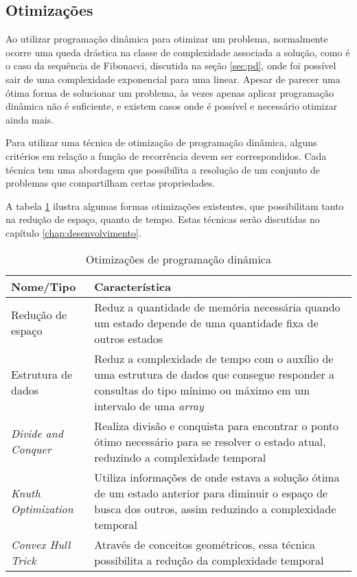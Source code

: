 \subsection{Otimizações}

Ao utilizar programação dinâmica para otimizar um problema, normalmente ocorre uma queda drástica na classe de complexidade associada a solução, como é o caso da sequência de Fibonacci, discutida na seção \ref{sec:pd}, onde foi possível sair de uma complexidade exponencial para uma linear. Apesar de parecer uma ótima forma de solucionar um problema, às vezes apenas aplicar programação dinâmica não é suficiente, e existem casos onde é possível e necessário otimizar ainda mais.

Para utilizar uma técnica de otimização de programação dinâmica, alguns critérios em relação a função de recorrência devem ser correspondidos. Cada técnica tem uma abordagem que possibilita a resolução de um conjunto de problemas que compartilham certas propriedades.

A tabela \ref{tab:otimizacoes} ilustra algumas formas otimizações existentes, que possibilitam tanto na redução de espaço, quanto de tempo. Estas técnicas serão discutidas no capítulo \ref{chap:desenvolvimento}.

\begin{table}[H]
	\centering
	\caption[Otimizações de programação dinâmica]{Otimizações de programação dinâmica}
	\label{tab:otimizacoes}
	\begin{tabular}{p{4cm} | p{11cm}}
		\hline \SPACE
		\textbf{Nome/Tipo} & \textbf{Característica} \\ \hline \SPACE
		Redução de espaço &  Reduz a quantidade de memória necessária quando um estado depende de uma quantidade fixa de outros estados \\ \hline \SPACE
		Estrutura de dados &  Reduz a complexidade de tempo com o auxílio de uma estrutura de dados que consegue responder a consultas do tipo mínimo ou máximo em um intervalo de uma \textit{array}  \\ \hline \SPACE
		\textit{Divide and Conquer} & Realiza divisão e conquista para encontrar o ponto ótimo necessário para se resolver o estado atual, reduzindo a complexidade temporal \\ \hline \SPACE
		\textit{Knuth Optimization} & Utiliza informações de onde estava a solução ótima de um estado anterior para diminuir o espaço de busca dos outros, assim reduzindo a complexidade temporal  \\ \hline \SPACE
		\textit{Convex Hull Trick} & Através de conceitos geométricos, essa técnica possibilita a redução da complexidade temporal \\ \hline 
	\end{tabular}
	
\end{table}

